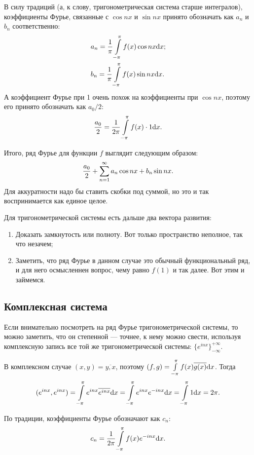 \documentclass[a4paper, 12pt]{article}
\begin{document}
В силу традиций (а, к слову, тригонометрическая система старше интегралов), коэффициенты Фурье, связанные с $\cos nx$ и $\sin nx$ принято обозначать как $a_n $ и $b_n$ соответственно:
\begin{align*}
&a_n = \frac{1}{\pi}  \int\limits_{-\pi}^{\pi} f(x) \cos nx \mathrm{d} x;\\
&b_n = \frac1\pi  \int\limits_{-\pi}^{\pi} f(x) \sin nx \mathrm{d} x.
\end{align*}
А коэффициент Фурье при 1 очень похож на коэффициенты при $\cos nx$, поэтому его принято обозначать как $a_0/2$:
$$
\frac{a_0}{2} = \frac{1}{2\pi} \int\limits_{-\pi}^{\pi} f(x) \cdot 1 \mathrm{d} x.
$$

Итого, ряд Фурье для функции $f$ выглядит следующим образом:
$$
\frac{a_0}{2} + \sum\limits_{n=1}^{\infty} a_n \cos nx + b_n \sin nx.
$$
Для аккуратности надо бы ставить скобки под суммой, но это и так воспринимается как единое целое.

Для тригонометрической системы есть дальше два вектора развития:
\begin{enumerate}
\item Доказать замкнутость или полноту. Вот только пространство неполное, так что незачем;
\item Заметить, что ряд Фурье в данном случае это обычный функциональный ряд, и для него осмысленнен вопрос, чему равно $f(1)$ и так далее. Вот этим и займемся.
\end{enumerate}

\subsection{Комплексная система}
Если внимательно посмотреть на ряд Фурье тригонометрической системы, то можно заметить, что он степенной --- точнее, к нему можно свести, используя комплексную запись все той же тригонометрической системы: $\{ e^{inx} \}_{-\infty}^{+\infty}$.

В комплексном случае $(x, y) = \overline{y, x}$, поэтому $(f, g) =  \int\limits_{-\pi}^{\pi} f(x)\overline{g(x)} \mathrm{d} x$. Тогда
\begin{gather*}
(e^{inx}, e^{inx}) =  \int\limits_{-\pi}^{\pi} e^{inx} \overline{e^{inx}} \mathrm{d} x=  \int\limits_{-\pi}^{\pi} e^{inx} e^{-inx} \mathrm{d} x =  \int\limits_{-\pi}^{\pi} 1 \mathrm{d} x = 2 \pi.
\end{gather*}

По традиции, коэффициенты Фурье обозначают как $c_n$:
$$
c_n = \frac{1}{2\pi}  \int\limits_{-\pi}^{\pi} f(x) e^{-inx} \mathrm{d} x.
$$
\end{document}
